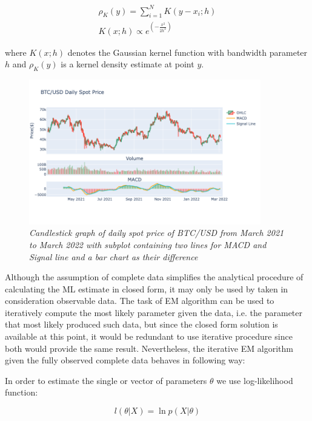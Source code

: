 \begin{gather} 
\rho_K(y) = \sum_{i=1}^{N} K(y - x_i;h)  \\
K(x;h) \propto e^{(-\frac{x^2}{2h^2})}
\end{gather}

where $K(x;h)$ denotes the Gaussian kernel function with bandwidth parameter $h$ and $\rho_K(y)$ is a kernel density estimate at point $y$.

\begin{figure}[ht]
\begin{center}
	\includegraphics[width=0.9\textwidth]{MACD.png}
\end{center}

\caption{\textit{ Candlestick graph of daily spot price of BTC/USD from March 2021 to March 2022 with subplot containing two lines for MACD and Signal line and a bar chart as their difference}}

\end{figure}

Although the assumption of complete data simplifies the analytical procedure of calculating the ML estimate in closed form, it may only be used by taken in consideration observable data. The task of EM algorithm can be used to iteratively compute the most likely parameter given the data, i.e. the parameter that most likely produced such data, but since the closed form solution is available at this point, it would be redundant to use iterative procedure since both would provide the same result. Nevertheless, the iterative EM algorithm given the fully observed complete data behaves in following way:

In order to estimate the single or vector of parameters $\theta$ we use log-likelihood function:

\begin{equation}
l(\theta|X) = \ln p(X|\theta) 
\end{equation}


